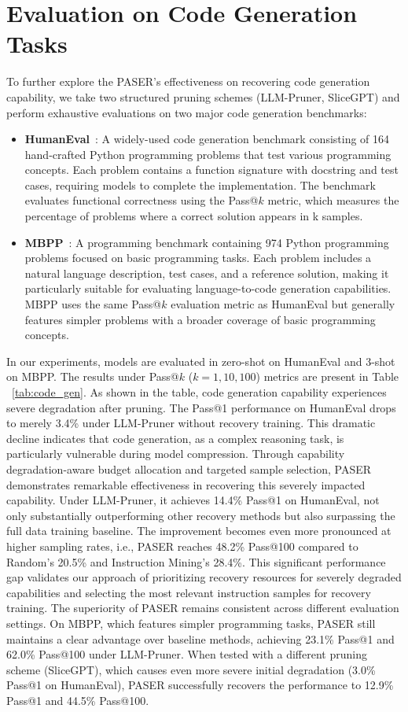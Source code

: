 \section{Evaluation on Code Generation Tasks}
\label{appendix: code}
To further explore the PASER's effectiveness on recovering code generation capability, we take two structured pruning schemes (LLM-Pruner, SliceGPT) and perform exhaustive evaluations on two major code generation benchmarks:
\begin{itemize}[leftmargin=*]
   \item \textbf{HumanEval}~\citep{chen2021evaluating}: A widely-used code generation benchmark consisting of 164 hand-crafted Python programming problems that test various programming concepts. Each problem contains a function signature with docstring and test cases, requiring models to complete the implementation. The benchmark evaluates functional correctness using the Pass@$k$ metric, which measures the percentage of problems where a correct solution appears in k samples.
   \item \textbf{MBPP}~\citep{austin2021program}: A programming benchmark containing 974 Python programming problems focused on basic programming tasks. Each problem includes a natural language description, test cases, and a reference solution, making it particularly suitable for evaluating language-to-code generation capabilities. MBPP uses the same Pass@$k$ evaluation metric as HumanEval but generally features simpler problems with a broader coverage of basic programming concepts.
\end{itemize}
In our experiments, models are evaluated in zero-shot on HumanEval and 3-shot on MBPP. The results under Pass@$k$ ($k=1, 10, 100$) metrics are present in Table ~\ref{tab:code_gen}. As shown in the table, code generation capability experiences severe degradation after pruning. The Pass@1 performance on HumanEval drops to merely 3.4\% under LLM-Pruner without recovery training. This dramatic decline indicates that code generation, as a complex reasoning task, is particularly vulnerable during model compression. Through capability degradation-aware budget allocation and targeted sample selection, PASER demonstrates remarkable effectiveness in recovering this severely impacted capability. Under LLM-Pruner, it achieves 14.4\% Pass@1 on HumanEval, not only substantially outperforming other recovery methods but also surpassing the full data training baseline. The improvement becomes even more pronounced at higher sampling rates, i.e., PASER reaches 48.2\% Pass@100 compared to Random's 20.5\% and Instruction Mining's 28.4\%. This significant performance gap validates our approach of prioritizing recovery resources for severely degraded capabilities and selecting the most relevant instruction samples for recovery training. The superiority of PASER remains consistent across different evaluation settings. On MBPP, which features simpler programming tasks, PASER still maintains a clear advantage over baseline methods, achieving 23.1\% Pass@1 and 62.0\% Pass@100 under LLM-Pruner. When tested with a different pruning scheme (SliceGPT), which causes even more severe initial degradation (3.0\% Pass@1 on HumanEval), PASER successfully recovers the performance to 12.9\% Pass@1 and 44.5\% Pass@100. 


